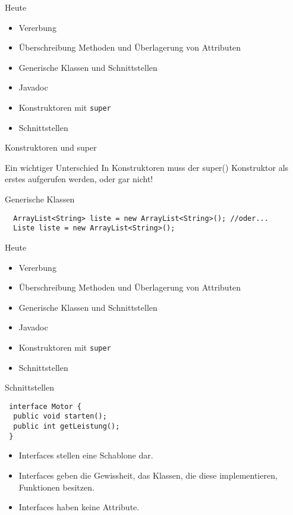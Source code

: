 \documentclass[18pt]{beamer}
\begin{document}
\begin{frame}[fragile]{Heute}
\begin{itemize}
 \item Vererbung \checkmark
 \item Überschreibung Methoden und Überlagerung von Attributen \checkmark
 \item Generische Klassen und Schnittstellen
 \item Javadoc
 \item Konstruktoren mit \verb|super|

 \item Schnittstellen 
\end{itemize}
\end{frame}

\begin{frame}{Konstruktoren und super}
 \begin{alertblock}{Ein wichtiger Unterschied}
  In Konstruktoren muss der super() Konstruktor als erstes aufgerufen werden,
  oder gar nicht!
 \end{alertblock}
\end{frame}


\begin{frame}[fragile]{Generische Klassen}
 \begin{lstlisting}
  ArrayList<String> liste = new ArrayList<String>(); //oder...
  Liste liste = new ArrayList<String>();
 \end{lstlisting}
\end{frame}

\begin{frame}[fragile]{Heute}
\begin{itemize}
 \item Vererbung \checkmark
 \item Überschreibung Methoden und Überlagerung von Attributen \checkmark
 \item Generische Klassen und Schnittstellen \checkmark
 \item Javadoc
 \item Konstruktoren mit \verb|super| \checkmark
 \item Schnittstellen
\end{itemize}
\end{frame}


\begin{frame}[fragile]{Schnittstellen}
\begin{lstlisting}
 interface Motor {
  public void starten();
  public int getLeistung();
 }
 \end{lstlisting}
 \begin{itemize}
  \item Interfaces stellen eine Schablone dar.
  \item Interfaces geben die Gewissheit, das Klassen, die diese implementieren, Funktionen besitzen.
  \item Interfaces haben keine Attribute.
 \end{itemize}

\end{frame}
\end{document}

